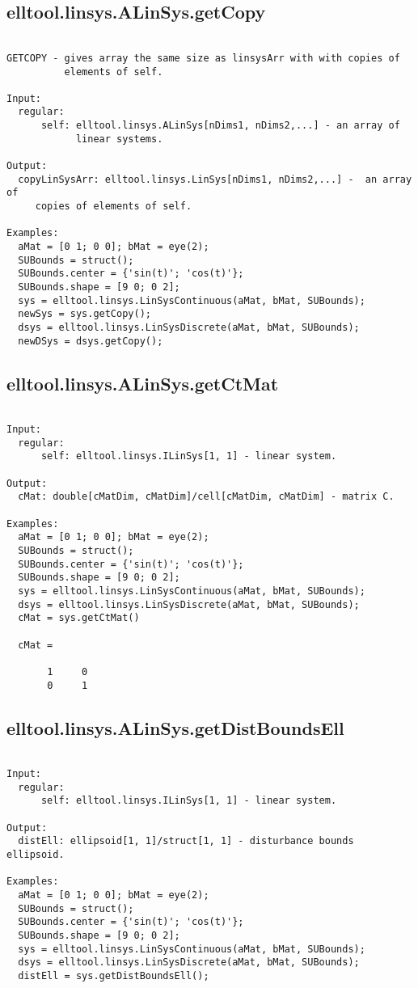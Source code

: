 \subsection{\texorpdfstring{elltool.linsys.ALinSys.getCopy}{getCopy}}\label{method:elltool.linsys.ALinSys.getCopy}
\begin{verbatim}

GETCOPY - gives array the same size as linsysArr with with copies of
          elements of self.

Input:
  regular:
      self: elltool.linsys.ALinSys[nDims1, nDims2,...] - an array of
            linear systems.

Output:
  copyLinSysArr: elltool.linsys.LinSys[nDims1, nDims2,...] -  an array of
     copies of elements of self.

Examples:
  aMat = [0 1; 0 0]; bMat = eye(2);
  SUBounds = struct();
  SUBounds.center = {'sin(t)'; 'cos(t)'};
  SUBounds.shape = [9 0; 0 2];
  sys = elltool.linsys.LinSysContinuous(aMat, bMat, SUBounds);
  newSys = sys.getCopy();
  dsys = elltool.linsys.LinSysDiscrete(aMat, bMat, SUBounds);
  newDSys = dsys.getCopy();
\end{verbatim}
\subsection{\texorpdfstring{elltool.linsys.ALinSys.getCtMat}{getCtMat}}\label{method:elltool.linsys.ALinSys.getCtMat}
\begin{verbatim}

Input:
  regular:
      self: elltool.linsys.ILinSys[1, 1] - linear system.

Output:
  cMat: double[cMatDim, cMatDim]/cell[cMatDim, cMatDim] - matrix C.

Examples:
  aMat = [0 1; 0 0]; bMat = eye(2);
  SUBounds = struct();
  SUBounds.center = {'sin(t)'; 'cos(t)'};
  SUBounds.shape = [9 0; 0 2];
  sys = elltool.linsys.LinSysContinuous(aMat, bMat, SUBounds);
  dsys = elltool.linsys.LinSysDiscrete(aMat, bMat, SUBounds);
  cMat = sys.getCtMat()

  cMat =

       1     0
       0     1
\end{verbatim}
\subsection{\texorpdfstring{elltool.linsys.ALinSys.getDistBoundsEll}{getDistBoundsEll}}\label{method:elltool.linsys.ALinSys.getDistBoundsEll}
\begin{verbatim}

Input:
  regular:
      self: elltool.linsys.ILinSys[1, 1] - linear system.

Output:
  distEll: ellipsoid[1, 1]/struct[1, 1] - disturbance bounds ellipsoid.

Examples:
  aMat = [0 1; 0 0]; bMat = eye(2);
  SUBounds = struct();
  SUBounds.center = {'sin(t)'; 'cos(t)'};
  SUBounds.shape = [9 0; 0 2];
  sys = elltool.linsys.LinSysContinuous(aMat, bMat, SUBounds);
  dsys = elltool.linsys.LinSysDiscrete(aMat, bMat, SUBounds);
  distEll = sys.getDistBoundsEll();
\end{verbatim}
